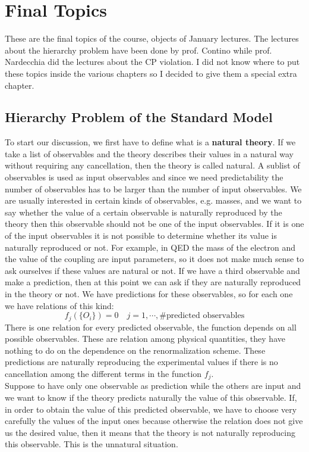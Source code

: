 \documentclass[../main.tex]{subfiles}
\begin{document}
\setchapterpreamble[u]{\margintoc}
\chapter[Final Topics]{Final Topics\footnotemark[0]}
These are the final topics of the course, objects of January lectures. The lectures about the hierarchy problem have been done by prof. Contino while prof. Nardecchia did the lectures about the CP violation. I did not know where to put these topics inside the various chapters so I decided to give them a special extra chapter.
\section{Hierarchy Problem of the Standard Model}
To start our discussion, we first have to define what is a \textbf{natural theory}. If we take a list of observables and the theory describes their values in a natural way without requiring any cancellation, then the theory is called natural. A sublist of observables is used as input observables and since we need predictability the number of observables has to be larger than the number of input observables. We are usually interested in certain kinds of observables, e.g. masses, and we want to say whether the value of a certain observable is naturally reproduced by the theory then this observable should not be one of the input observables. If it is one of the input observables it is not possible to determine whether its value is naturally reproduced or not. For example, in QED the mass of the electron and the value of the coupling are input parameters, so it does not make much sense to ask ourselves if these values are natural or not. If we have a third observable and make a prediction, then at this point we can ask if they are naturally reproduced in the theory or not. We have predictions for these observables, so for each one we have relations of this kind:
\[
f_j(\{O_i\})=0 \quad j=1,\cdots,\text{\# predicted observables}
\]
There is one relation for every predicted observable, the function depends on all possible observables. These are relation among physical quantities, they have nothing to do on the dependence on the renormalization scheme. These predictions are naturally reproducing the experimental values if there is no cancellation among the different terms in the function $f_j$.\\
Suppose to have only one observable as prediction while the others are input and we want to know if the theory predicts naturally the value of this observable. If, in order to obtain the value of this predicted observable, we have to choose very carefully the values of the input ones because otherwise the relation does not give us the desired value, then it means that the theory is not naturally reproducing this observable. This is the unnatural situation.\\
\end{document}
